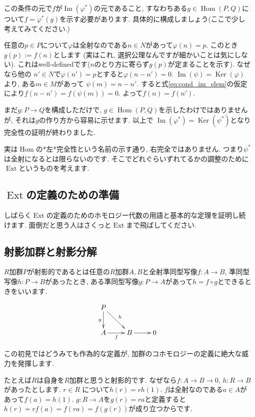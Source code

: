 \documentclass{jsarticle}
\newcommand{\makeop}[1]{\mathop{\mathrm{#1}}\nolimits}
\def\Im{\makeop{Im}}
\def\Ker{\makeop{Ker}}
\def\Hom{\makeop{Hom}}
\def\Ext{\makeop{Ext}}
\theoremstyle{definition}
\numberwithin{theorem}{section}
\begin{document}
この条件の元で$f$が$\Im(\varphi^*)$の元であること, すなわちある$g\in\Hom(P, Q)$について$f = \varphi^*(g)$を示す必要があります. 具体的に構成しましょう(ここで少し考えてみてください.)

任意の$p\in P$について$\varphi$は全射なのである$n\in N$があって$\varphi(n) = p$. このとき$g(p) := f(n)$とします
(実はこれ, 選択公理なんですが細かいことは気にしない). これはwell-definedです($n$のとり方に寄らず$g(p)$が定まることを示す). なぜなら他の
$n'\in N$で$\varphi(n') = p$とすると$\varphi(n-n') = 0$. $\Im(\psi) = \Ker(\varphi)$より, ある$m\in M$があって
$\psi(m) = n-n'$. すると式\ref{eq:cond_im_elem}の仮定により$f(n-n') = f(\psi(m)) = 0$. よって$f(n) = f(n')$.

まだ$g: P\rightarrow Q$を構成しただけで, $g\in\Hom(P, Q)$を示したわけではありませんが, それは$g$の作り方から容易に示せます. 以上で
$\Im(\varphi^*) = \Ker(\psi^*)$となり完全性の証明が終わりました. 

実は$\Hom$の*左*完全性という名前の示す通り, 右完全ではありません. つまり$\psi^*$は全射になるとは限らないのです. そこでどれぐらいずれてるかの調整のために$\Ext$というものを考えます.

\subsection{$\Ext$の定義のための準備}
しばらく$\Ext$の定義のためのホモロジー代数の用語と基本的な定理を証明し続けます. 面倒だと思う人はさくっと$\Ext$まで飛ばしてください.

\subsection{射影加群と射影分解}
\label{sc:proj_module}
$R$加群$P$が射影的であるとは任意の$R$加群$A, B$と全射準同型写像$f: A\rightarrow B$, 準同型写像$h: P\rightarrow B$があったとき, 
ある準同型写像$g: P\rightarrow A$があって$h = f\circ g$とできるときをいいます.

\begin{equation*}
\xymatrix{
  P \ar[dr]^h \ar[d]_g & \\
  A \ar[r]_f & B \ar[r] & 0
}
\end{equation*}

この初見ではどうみても作為的な定義が, 加群のコホモロジーの定義に絶大な威力を発揮します.

たとえば$R$は自身を$R$加群と思うと射影的です. なぜなら$f: A\rightarrow B\rightarrow 0$, $h: R \rightarrow B$があったとします.
$r\in R$ について$h(r) = rh(1)$. $f$は全射なのである$a\in A$があって$f(a) = h(1)$. $g:R \rightarrow A$を$g(r) = ra$と定義すると
$h(r) = rf(a) = f(ra) = f(g(r))$が成り立つからです.
\end{document}
